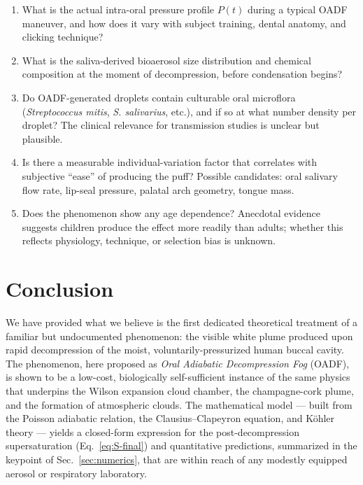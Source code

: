 \documentclass[11pt,a4paper]{article}
\theoremstyle{definition}
\theoremstyle{plain}
\begin{document}
\begin{enumerate}
  \item What is the actual intra-oral pressure profile $P(t)$ during a typical OADF maneuver, and how does it vary with subject training, dental anatomy, and clicking technique?
  \item What is the saliva-derived bioaerosol size distribution and chemical composition at the moment of decompression, before condensation begins?
  \item Do OADF-generated droplets contain culturable oral microflora (\textit{Streptococcus mitis}, \textit{S. salivarius}, etc.), and if so at what number density per droplet? The clinical relevance for transmission studies is unclear but plausible.
  \item Is there a measurable individual-variation factor that correlates with subjective ``ease'' of producing the puff? Possible candidates: oral salivary flow rate, lip-seal pressure, palatal arch geometry, tongue mass.
  \item Does the phenomenon show any age dependence? Anecdotal evidence suggests children produce the effect more readily than adults; whether this reflects physiology, technique, or selection bias is unknown.
\end{enumerate}

\section{Conclusion}
\label{sec:conclusion}

We have provided what we believe is the first dedicated theoretical treatment of a familiar but undocumented phenomenon: the visible white plume produced upon rapid decompression of the moist, voluntarily-pressurized human buccal cavity. The phenomenon, here proposed as \emph{Oral Adiabatic Decompression Fog} (OADF), is shown to be a low-cost, biologically self-sufficient instance of the same physics that underpins the Wilson expansion cloud chamber, the champagne-cork plume, and the formation of atmospheric clouds. The mathematical model — built from the Poisson adiabatic relation, the Clausius–Clapeyron equation, and Köhler theory — yields a closed-form expression for the post-decompression supersaturation (Eq.~\ref{eq:S-final}) and quantitative predictions, summarized in the keypoint of Sec.~\ref{sec:numerics}, that are within reach of any modestly equipped aerosol or respiratory laboratory.
\end{document}
